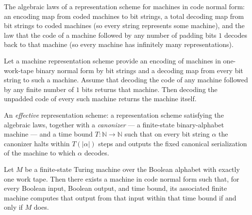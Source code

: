 \begin{definition}
\label{Turing.MachineCode}
\leanok
{}
The algebraic laws of a representation scheme for machines in code normal
form: an encoding map from coded machines to bit strings, a total decoding
map from bit strings to coded machines (so every string represents some
machine), and the law that the code of a machine followed by any number of
padding bits $1$ decodes back to that machine (so every machine has
infinitely many representations).
\end{definition}

\begin{theorem}
\label{Turing.MachineCode.decode_encode}
\leanok
{}
Let a machine representation scheme provide an encoding of machines in one-work-tape
binary normal form by bit strings and a decoding map from every bit string to such a
machine. Assume that decoding the code of any machine followed by any finite number of
$1$ bits returns that machine. Then decoding the unpadded code of every such machine
returns the machine itself.
\end{theorem}

\begin{definition}
\label{Turing.EffectiveMachineCode}
\leanok
{}
An \emph{effective} representation scheme: a representation scheme
satisfying the algebraic laws, together with a \emph{canonizer} --- a
finite-state binary-alphabet machine --- and a time bound
$T : \mathbb{N} \to \mathbb{N}$ such that on every bit string $\alpha$ the
canonizer halts within $T(|\alpha|)$ steps and outputs the fixed canonical
serialization of the machine to which $\alpha$ decodes.
\end{definition}

\begin{theorem}
\label{Turing.exists_codeTM}
\leanok
{}
Let $M$ be a finite-state Turing machine over the Boolean alphabet with exactly one work
tape. Then there exists a machine in code normal form such that, for every Boolean
input, Boolean output, and time bound, its associated finite machine computes that
output from that input within that time bound if and only if $M$ does.
\end{theorem}

